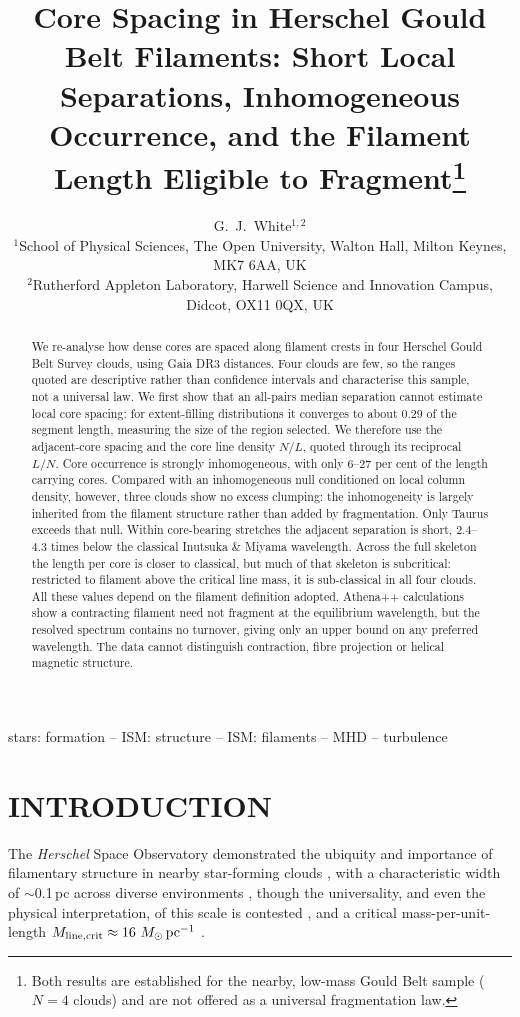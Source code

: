 \documentclass[usenatbib,twoside,twocolumn]{mnras}
\title[Core spacing and filament occupancy in HGBS filaments]{Core Spacing in Herschel Gould Belt Filaments: Short Local Separations, Inhomogeneous Occurrence, and the Filament Length Eligible to Fragment\thanks{Both results are established for the nearby, low-mass Gould Belt sample ($N=4$ clouds) and are not offered as a universal fragmentation law.}}
\author[G.~J.~White]{G.~J.~White$^{1,2}$\\
$^{1}$School of Physical Sciences, The Open University, Walton Hall, Milton Keynes, MK7 6AA, UK\\
$^{2}$Rutherford Appleton Laboratory, Harwell Science and Innovation Campus, Didcot, OX11 0QX, UK}
\begin{document}
\maketitle

\begin{abstract}
We re-analyse how dense cores are spaced along filament crests in four Herschel Gould Belt Survey clouds, using Gaia DR3 distances. Four clouds are few, so the ranges quoted are descriptive rather than confidence intervals and characterise this sample, not a universal law. We first show that an all-pairs median separation cannot estimate local core spacing: for extent-filling distributions it converges to about $0.29$ of the segment length, measuring the size of the region selected. We therefore use the adjacent-core spacing and the core line density $N/L$, quoted through its reciprocal $L/N$. Core occurrence is strongly inhomogeneous, with only $6$--$27$ per cent of the length carrying cores. Compared with an inhomogeneous null conditioned on local column density, however, three clouds show no excess clumping: the inhomogeneity is largely inherited from the filament structure rather than added by fragmentation. Only Taurus exceeds that null. Within core-bearing stretches the adjacent separation is short, $2.4$--$4.3$ times below the classical Inutsuka \& Miyama wavelength. Across the full skeleton the length per core is closer to classical, but much of that skeleton is subcritical: restricted to filament above the critical line mass, it is sub-classical in all four clouds. All these values depend on the filament definition adopted. Athena++ calculations show a contracting filament need not fragment at the equilibrium wavelength, but the resolved spectrum contains no turnover, giving only an upper bound on any preferred wavelength. The data cannot distinguish contraction, fibre projection or helical magnetic structure.
\end{abstract}

\begin{keywords}
stars: formation -- ISM: structure -- ISM: filaments -- MHD -- turbulence
\end{keywords}

\section{INTRODUCTION}

The \textit{Herschel} Space Observatory demonstrated the ubiquity and importance of filamentary structure in nearby star-forming clouds \citep{Andre2010}, with a characteristic width of $\sim$0.1\,pc across diverse environments \citep{Arzoumanian2011}, though the universality, and even the physical interpretation, of this scale is contested \citep{Panopoulou2017,Panopoulou2022}, and a critical mass-per-unit-length $M_{\rm line,crit}\approx16~M_\odot\,{\rm pc^{-1}}$ \citep{Ostriker1964}.
\end{document}
